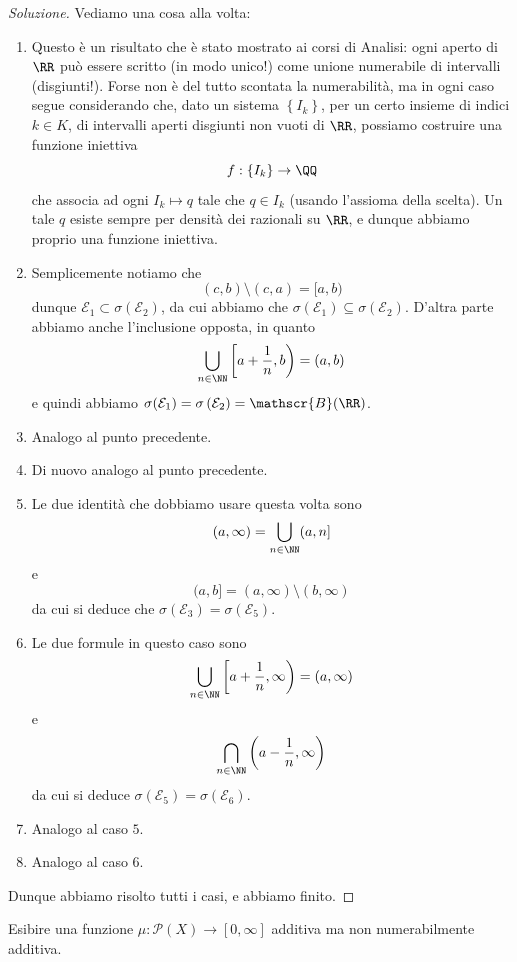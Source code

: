 \documentclass[11pt]{scrartcl}
\newcommand{\parti}[1]{\mathcal{P}\!\left(#1\right)}
\begin{document}
	\begin{proof}[Soluzione]
		Vediamo una cosa alla volta:
		\begin{enumerate}
			\item Questo è un risultato che è stato mostrato ai corsi di Analisi: ogni aperto di $\RR$ può essere scritto (in modo unico!) come unione numerabile di intervalli (disgiunti!). Forse non è del tutto scontata la numerabilità, ma in ogni caso segue considerando che, dato un sistema $\left\{I_k\right\}$, per un certo insieme di indici $k\in K$, di intervalli aperti disgiunti non vuoti di $\RR$, possiamo costruire una funzione iniettiva 
			$$f:\left\{I_k\right\}\to \QQ$$
			che associa ad ogni $I_k\mapsto  q$ tale che $q\in I_k$ (usando l'assioma della scelta). Un tale $q$ esiste sempre per densità dei razionali su $\RR$, e dunque abbiamo proprio una funzione iniettiva.
			\item Semplicemente notiamo che 
			$$(c,b)\setminus (c,a)=[a,b)$$
			dunque $\mathcal{E}_1\subset \sigma\left(\mathcal{E}_2\right)$, da cui abbiamo che $\sigma\left(\mathcal{E}_1\right)\subseteq \sigma\left(\mathcal{E}_2\right)$. D'altra parte abbiamo anche l'inclusione opposta, in quanto
			$$\bigcup_{n\in\NN}\left[ a+\frac{1}{n},b \right)=(a,b)$$
			e quindi abbiamo $\sigma(\mathcal{E}_1)=\sigma\left(\mathcal{E}_2\right)=\mathscr{B}(\RR)$.
			\item Analogo al punto precedente.
			\item Di nuovo analogo al punto precedente.
			\item Le due identità che dobbiamo usare questa volta sono
			$$(a,\infty)=\bigcup_{n\in\NN}(a,n]$$
			e 
			$$(a,b]=(a,\infty)\setminus(b,\infty)$$
			da cui si deduce che $\sigma\left(\mathcal{E}_3\right)=\sigma\left(\mathcal{E}_5\right)$. 
			\item Le due formule in questo caso sono
			$$\bigcup_{n\in\NN}\left[a+\frac{1}{n},\infty\right)=(a,\infty)$$
			e 
			$$\bigcap_{n\in\NN}\left(a-\frac{1}{n},\infty\right)$$
			da cui si deduce $\sigma(\mathcal{E}_5)=\sigma\left(\mathcal{E}_6\right)$.
			\item Analogo al caso $5$.
			\item Analogo al caso $6$.
		\end{enumerate}
		Dunque abbiamo risolto tutti i casi, e abbiamo finito.
	\end{proof}
	\begin{exercise}
		Esibire una funzione $\mu:\parti{X}\to [0,\infty]$ additiva ma non numerabilmente additiva.
	\end{exercise}
\end{document}
